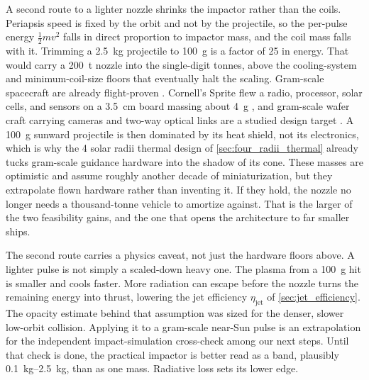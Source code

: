 \documentclass{article}
\begin{document}
A second route to a lighter nozzle shrinks the impactor rather than the coils. Periapsis speed is fixed by the orbit and not by the projectile, so the per-pulse energy $\tfrac{1}{2}mv^2$ falls in direct proportion to impactor mass, and the coil mass falls with it. Trimming a \SI{2.5}{\kilo\gram} projectile to \SI{100}{\gram} is a factor of 25 in energy. That would carry a \SI{200}{\tonne} nozzle into the single-digit tonnes, above the cooling-system and minimum-coil-size floors that eventually halt the scaling. Gram-scale spacecraft are already flight-proven \cite{tavares2019kicksat2}. Cornell's Sprite flew a radio, processor, solar cells, and sensors on a \SI{3.5}{\centi\meter} board massing about \SI{4}{\gram} \cite{manchester2013kicksat}, and gram-scale wafer craft carrying cameras and two-way optical links are a studied design target \cite{lubin2016roadmap}. A \SI{100}{\gram} sunward projectile is then dominated by its heat shield, not its electronics, which is why the 4 solar radii thermal design of \autoref{sec:four_radii_thermal} already tucks gram-scale guidance hardware into the shadow of its cone. These masses are optimistic and assume roughly another decade of miniaturization, but they extrapolate flown hardware rather than inventing it. If they hold, the nozzle no longer needs a thousand-tonne vehicle to amortize against. That is the larger of the two feasibility gains, and the one that opens the architecture to far smaller ships.

The second route carries a physics caveat, not just the hardware floors above. A lighter pulse is not simply a scaled-down heavy one. The plasma from a \SI{100}{\gram} hit is smaller and cools faster. More radiation can escape before the nozzle turns the remaining energy into thrust, lowering the jet efficiency $\eta_{\mathrm{jet}}$ of \autoref{sec:jet_efficiency}. The opacity estimate behind that assumption was sized for the denser, slower low-orbit collision. Applying it to a gram-scale near-Sun pulse is an extrapolation for the independent impact-simulation cross-check among our next steps. Until that check is done, the practical impactor is better read as a band, plausibly \SIrange{0.1}{2.5}{\kilo\gram}, than as one mass. Radiative loss sets its lower edge.
\end{document}
